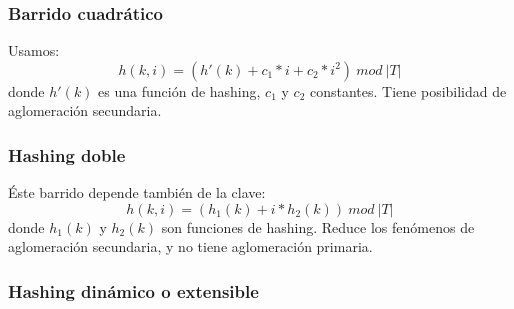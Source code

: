 \subsubsection{Barrido cuadr\'atico}
Usamos:
$$h(k,i) = (h'(k) + c_1 * i + c_2 * i^2)\ mod\ |T|$$
donde $h'(k)$ es una funci\'on de hashing, $c_1$ y $c_2$ constantes. Tiene posibilidad de aglomeraci\'on secundaria.
\subsubsection{Hashing doble}
\'Este barrido depende tambi\'en de la clave:
$$h(k,i) = (h_1(k) + i * h_2(k))\ mod\ |T|$$
donde $h_1(k)$ y $h_2(k)$ son funciones de hashing. Reduce los fen\'omenos de aglomeraci\'on secundaria, y no tiene aglomeraci\'on primaria.
\subsubsection{Hashing din\'amico o extensible}
